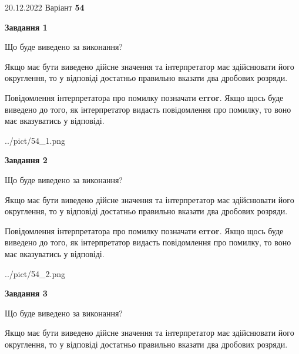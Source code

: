 \documentclass[12pt, ukrainian]{article}
\begin{document}
{20.12.2022 Варіант \No \textbf { 54 }\par}
{
\begin {Large}

{\begin {center}\textbf{Завдання 1}\end {center}}\par
Що буде виведено за виконання? \par

Якщо має бути виведено дійсне значення та інтерпретатор має здійснювати його округлення, 
то у відповіді достатньо правильно вказати два дробових розряди.

Повідомлення інтерпретатора про помилку позначати \textbf{error}.
Якщо щось буде виведено до того, як інтерпретатор видасть повідомлення про помилку, 
то воно має вказуватись у відповіді. \par

\begin{center}
	{../pict/54_1.png}
\end{center}
\newpage

{\begin {center}\textbf{Завдання 2}\end {center}}\par
Що буде виведено за виконання? \par

Якщо має бути виведено дійсне значення та інтерпретатор має здійснювати його округлення, 
то у відповіді достатньо правильно вказати два дробових розряди.

Повідомлення інтерпретатора про помилку позначати \textbf{error}.
Якщо щось буде виведено до того, як інтерпретатор видасть повідомлення про помилку, 
то воно має вказуватись у відповіді. \par

\begin{center}
	{../pict/54_2.png}
\end{center}
\newpage

{\begin {center}\textbf{Завдання 3}\end {center}}\par
Що буде виведено за виконання? \par

Якщо має бути виведено дійсне значення та інтерпретатор має здійснювати його округлення, 
то у відповіді достатньо правильно вказати два дробових розряди.


\end{Large}}
\end{document}
